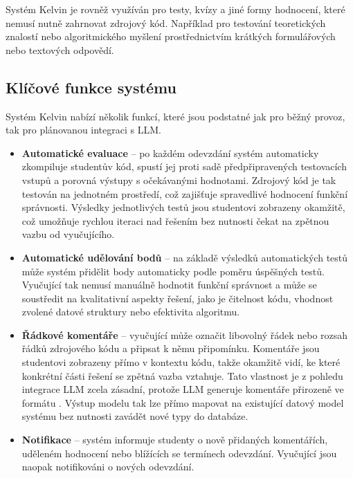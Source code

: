 Systém Kelvin je rovněž využíván pro testy, kvízy a jiné formy hodnocení, které nemusí nutně zahrnovat zdrojový kód.
Například pro testování teoretických znalostí nebo algoritmického myšlení prostřednictvím krátkých formulářových nebo textových odpovědí.

\subsection{Klíčové funkce systému}
\label{subsec:kelvin-features}

Systém Kelvin nabízí několik funkcí, které jsou podstatné jak pro běžný provoz, tak pro plánovanou integraci s LLM\@.

\begin{itemize}
    \item \textbf{Automatické evaluace} -- po každém odevzdání systém automaticky zkompiluje studentův kód, spustí jej proti sadě předpřipravených testovacích vstupů a porovná výstupy s očekávanými hodnotami.
    Zdrojový kód je tak testován na jednotném prostředí, což zajišťuje spravedlivé hodnocení funkční správnosti.
    Výsledky jednotlivých testů jsou studentovi zobrazeny okamžitě, což umožňuje rychlou iteraci nad řešením bez nutnosti čekat na zpětnou vazbu od vyučujícího.

    \item \textbf{Automatické udělování bodů} -- na základě výsledků automatických testů může systém přidělit body automaticky podle poměru úspěšných testů.
    Vyučující tak nemusí manuálně hodnotit funkční správnost a může se soustředit na kvalitativní aspekty řešení, jako je čitelnost kódu, vhodnost zvolené datové struktury nebo efektivita algoritmu.

    \item \textbf{Řádkové komentáře} -- vyučující může označit libovolný řádek nebo rozsah řádků zdrojového kódu a připsat k němu připomínku.
    Komentáře jsou studentovi zobrazeny přímo v kontextu kódu, takže okamžitě vidí, ke které konkrétní části řešení se zpětná vazba vztahuje.
    Tato vlastnost je z pohledu integrace LLM zcela zásadní, protože LLM generuje komentáře přirozeně ve formátu .
    Výstup modelu tak lze přímo mapovat na existující datový model systému bez nutnosti zavádět nové typy do databáze.

    \item \textbf{Notifikace} -- systém informuje studenty o nově přidaných komentářích, uděleném hodnocení nebo blížících se termínech odevzdání.
    Vyučující jsou naopak notifikováni o nových odevzdání.
\end{itemize}

\endinput
